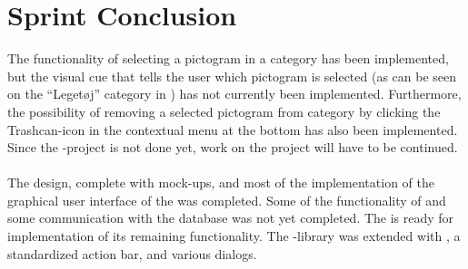 
\chapter{Sprint Conclusion}
\label{cha:conclusion_sprint_2}

The functionality of selecting a pictogram in a category has been implemented, but the visual cue that tells the user which pictogram is selected (as can be seen on the ``Leget\o j'' category in ) has not currently been implemented. Furthermore, the possibility of removing a selected pictogram from category by clicking the Trashcan-icon in the contextual menu at the bottom has also been implemented. Since the \ct-project is not done yet, work on the project will have to be continued.
\\\\
The design, complete with mock-ups, and most of the implementation of the graphical user interface of the \ct was completed. Some of the functionality of \ct and some communication with the database was not yet completed. The \ct is ready for implementation of its remaining functionality. The \gc-library was extended with , a standardized action bar, and various dialogs.